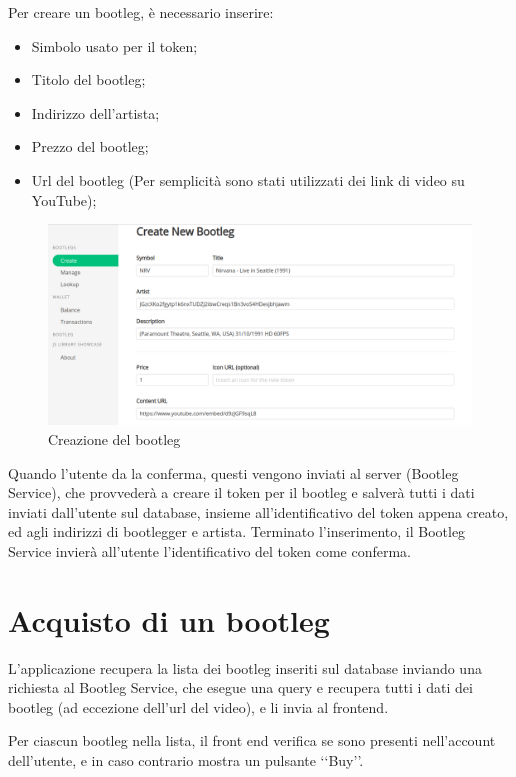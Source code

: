 Per creare un bootleg, è necessario inserire:
\begin{itemize}
    \item Simbolo usato per il token;
    \item Titolo del bootleg;
    \item Indirizzo dell'artista;
    \item Prezzo del bootleg;
    \item Url del bootleg (Per semplicità sono stati utilizzati dei link di video su YouTube);
\end{itemize}

\begin{figure}[H]
    \includegraphics[width=\linewidth]{images/application/create-bootleg.png}
    \caption{Creazione del bootleg}
    \label{fig:bootleg_create}
\end{figure}

Quando l'utente da la conferma, questi vengono inviati al server (Bootleg Service), che provvederà a creare il token per il bootleg e salverà tutti i dati inviati dall'utente sul database, insieme all'identificativo del token appena creato, ed agli indirizzi di bootlegger e artista. Terminato l'inserimento, il Bootleg Service invierà all'utente l'identificativo del token come conferma.

\section{Acquisto di un bootleg}

L'applicazione recupera la lista dei bootleg inseriti sul database inviando una richiesta al Bootleg Service, che esegue una query e recupera tutti i dati dei bootleg (ad eccezione dell'url del video), e li invia al frontend.

Per ciascun bootleg nella lista, il front end verifica se sono presenti nell'account dell'utente, e in caso contrario mostra un pulsante ‘‘Buy’’.

